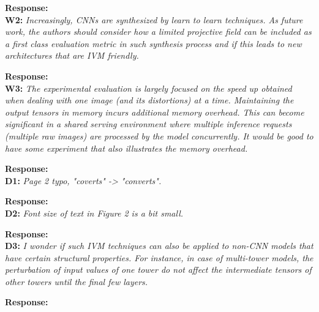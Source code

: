 \documentclass[preprint]{vldb}
\begin{document}
\vspace{2mm}
\noindent \textbf{Response:}\\

\vspace{2mm}
\noindent \textbf{W2:} \textit{ Increasingly, CNNs are synthesized by learn to learn techniques. As future work, the authors should consider how a limited projective field can be included as a first class evaluation metric in such synthesis process and if this leads to new architectures that are IVM friendly.}

\vspace{2mm}
\noindent \textbf{Response:}\\

\vspace{2mm}
\noindent \textbf{W3:} \textit{ The experimental evaluation is largely focused on the speed up obtained when dealing with one image (and its distortions) at a time. Maintaining the output tensors in memory incurs additional memory overhead. This can become significant in a shared serving environment where multiple inference requests (multiple raw images) are processed by the model concurrently. It would be good to have some experiment that also illustrates the memory overhead.}

\vspace{2mm}
\noindent \textbf{Response:}\\

\vspace{2mm}
\noindent \textbf{D1:} \textit{ Page 2 typo, "coverts" -> "converts".}

\vspace{2mm}
\noindent \textbf{Response:}\\

\vspace{2mm}
\noindent \textbf{D2:} \textit{ Font size of text in Figure 2 is a bit small.}

\vspace{2mm}
\noindent \textbf{Response:}\\

\vspace{2mm}
\noindent \textbf{D3:} \textit{  I wonder if such IVM techniques can also be applied to non-CNN models that have certain structural properties. For instance, in case of multi-tower models, the perturbation of input values of one tower do not affect the intermediate tensors of other towers until the final few layers.}

\vspace{2mm}
\noindent \textbf{Response:}\\
\end{document}

